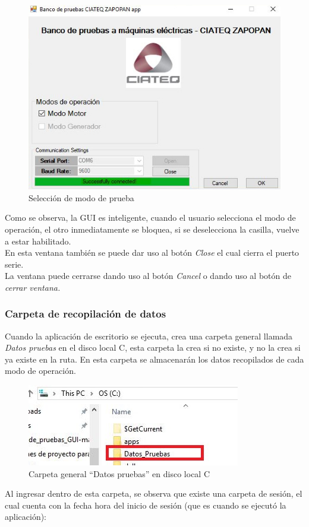\documentclass[12pt,titlepage]{article}
\begin{document}
\begin{figure}[htbp]
\hspace*{3.8cm} 
\includegraphics[scale=0.72]{Seleected_mode2}
\caption{Selección de modo de prueba}
\end{figure}

Como se observa, la GUI es inteligente, cuando el usuario selecciona el modo de operación, el otro inmediatamente se bloquea, si se deselecciona la casilla, vuelve a estar habilitado. \\ 

En esta ventana también se puede dar uso al botón \textit{Close} el cual cierra el puerto serie. \\

La  ventana puede cerrarse dando uso al botón \textit{Cancel} o dando uso al botón de \textit{cerrar ventana.}

\subsubsection{Carpeta de recopilación de datos}
Cuando la aplicación de escritorio se ejecuta, crea una carpeta general llamada \textit{Datos pruebas} en el disco local C, esta carpeta la crea si no existe, y no la crea si ya existe en la ruta. En esta carpeta se almacenarán los datos recopilados de cada modo de operación.   \\ 
\begin{figure}[htbp]
\hspace*{5.8cm} 
\includegraphics[scale=0.78]{ruta_inicial}
\caption{Carpeta general ``Datos pruebas'' en disco local C}
\end{figure}
\newpage
Al ingresar dentro de esta carpeta, se observa que existe una carpeta de sesión, el cual cuenta con  la fecha hora del inicio de sesión (que es cuando se ejecutó la aplicación): \\
\end{document}
